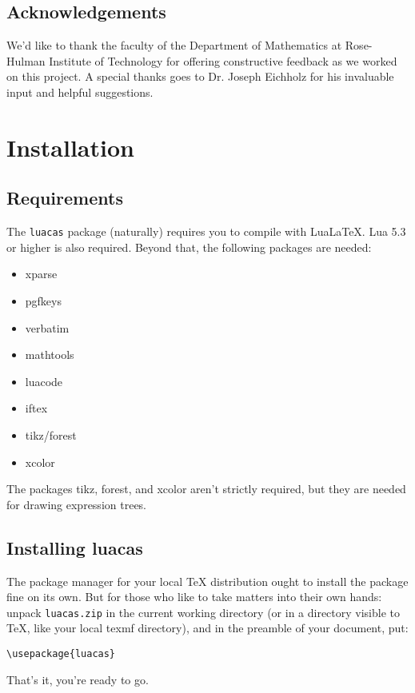 \documentclass{article}
\begin{document}
\subsection{Acknowledgements}

We'd like to thank the faculty of the Department of Mathematics at Rose-Hulman Institute of Technology for offering constructive feedback as we worked on this project. A special thanks goes to Dr. Joseph Eichholz for his invaluable input and helpful suggestions.

\section{Installation}

\subsection{Requirements}

The \texttt{luacas} package (naturally) requires you to compile with Lua\LaTeX{}. Lua 5.3 or higher is also required. Beyond that, the following packages are needed:
\begin{multicols}{2}
{\ttfamily
\begin{itemize}
    \item xparse
    \item pgfkeys
    \item verbatim
    \item mathtools
    \item luacode
    \item iftex
    \item tikz/forest
    \item xcolor
\end{itemize}}
\end{multicols}
The packages {\ttfamily tikz}, {\ttfamily forest}, and {\ttfamily xcolor} aren't strictly required, but they are needed for drawing expression trees.

\subsection{Installing {\ttfamily luacas}}
The package manager for your local TeX distribution ought to install the package fine on its own. But for those who like to take matters into their own hands: unpack \texttt{luacas.zip} in the current working directory (or in a directory visible to TeX, like your local texmf directory), and in the preamble of your document, put:
\begin{verbatim}
\usepackage{luacas}
\end{verbatim}
That's it, you're ready to go.
\end{document}
